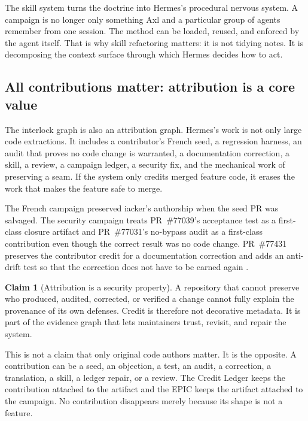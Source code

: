 \documentclass[11pt]{article}
\theoremstyle{definition}
\newtheorem{claim}{Claim}
\theoremstyle{plain}
\theoremstyle{remark}
\begin{document}
The skill system turns the doctrine into Hermes's procedural nervous system.
A campaign is no longer only something Axl and a particular group of agents
remember from one session. The method can be loaded, reused, and enforced by
the agent itself. That is why skill refactoring matters: it is not tidying
notes. It is decomposing the context surface through which Hermes decides how
to act.

\subsection{All contributions matter: attribution is a core value}
\label{sec:attribution-core}

The interlock graph is also an attribution graph. Hermes's work is not only
large code extractions. It includes a contributor's French seed, a regression
harness, an audit that proves no code change is warranted, a documentation
correction, a skill, a review, a campaign ledger, a security fix, and the
mechanical work of preserving a seam. If the system only credits merged
feature code, it erases the work that makes the feature safe to merge.

The French campaign preserved iacker's authorship when the seed PR was
salvaged. The security campaign treats PR~\#77039's acceptance test as a
first-class closure artifact and PR~\#77031's no-bypass audit as a first-class
contribution even though the correct result was no code change. PR~\#77431
preserves the contributor credit for a documentation correction and adds an
anti-drift test so that the correction does not have to be earned again
\citep{hermespr77431}.

\begin{claim}[Attribution is a security property]
\label{cl:attribution-security}
A repository that cannot preserve who produced, audited, corrected, or
verified a change cannot fully explain the provenance of its own defenses.
Credit is therefore not decorative metadata. It is part of the evidence graph
that lets maintainers trust, revisit, and repair the system.
\end{claim}

This is not a claim that only original code authors matter. It is the opposite.
A contribution can be a seed, an objection, a test, an audit, a correction, a
translation, a skill, a ledger repair, or a review. The Credit Ledger keeps
the contribution attached to the artifact and the EPIC keeps the artifact
attached to the campaign. No contribution disappears merely because its shape
is not a feature.
\end{document}
